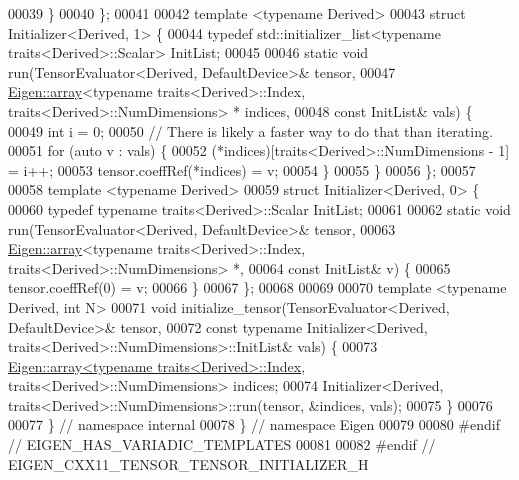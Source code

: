 \begin{DoxyCode}
00039   \}
00040 \};
00041 
00042 \textcolor{keyword}{template} <\textcolor{keyword}{typename} Derived>
00043 \textcolor{keyword}{struct }Initializer<Derived, 1> \{
00044   \textcolor{keyword}{typedef} std::initializer\_list<typename traits<Derived>::Scalar> InitList;
00045 
00046   \textcolor{keyword}{static} \textcolor{keywordtype}{void} run(TensorEvaluator<Derived, DefaultDevice>& tensor,
00047                   \hyperlink{class_eigen_1_1array}{Eigen::array}<\textcolor{keyword}{typename} traits<Derived>::Index, traits<Derived>::NumDimensions>
      * indices,
00048                   \textcolor{keyword}{const} InitList& vals) \{
00049     \textcolor{keywordtype}{int} i = 0;
00050     \textcolor{comment}{// There is likely a faster way to do that than iterating.}
00051     \textcolor{keywordflow}{for} (\textcolor{keyword}{auto} v : vals) \{
00052       (*indices)[traits<Derived>::NumDimensions - 1] = i++;
00053       tensor.coeffRef(*indices) = v;
00054     \}
00055   \}
00056 \};
00057 
00058 \textcolor{keyword}{template} <\textcolor{keyword}{typename} Derived>
00059 \textcolor{keyword}{struct }Initializer<Derived, 0> \{
00060   \textcolor{keyword}{typedef} \textcolor{keyword}{typename} traits<Derived>::Scalar InitList;
00061 
00062   \textcolor{keyword}{static} \textcolor{keywordtype}{void} run(TensorEvaluator<Derived, DefaultDevice>& tensor,
00063                   \hyperlink{class_eigen_1_1array}{Eigen::array}<\textcolor{keyword}{typename} traits<Derived>::Index, traits<Derived>::NumDimensions>
      *,
00064                   \textcolor{keyword}{const} InitList& v) \{
00065     tensor.coeffRef(0) = v;
00066   \}
00067 \};
00068 
00069 
00070 \textcolor{keyword}{template} <\textcolor{keyword}{typename} Derived, \textcolor{keywordtype}{int} N>
00071 \textcolor{keywordtype}{void} initialize\_tensor(TensorEvaluator<Derived, DefaultDevice>& tensor,
00072                        \textcolor{keyword}{const} \textcolor{keyword}{typename} Initializer<Derived, traits<Derived>::NumDimensions>::InitList& vals)
       \{
00073   \hyperlink{class_eigen_1_1array}{Eigen::array<typename traits<Derived>::Index}, 
      traits<Derived>::NumDimensions> indices;
00074   Initializer<Derived, traits<Derived>::NumDimensions>::run(tensor, &indices, vals);
00075 \}
00076 
00077 \}  \textcolor{comment}{// namespace internal}
00078 \}  \textcolor{comment}{// namespace Eigen}
00079 
00080 \textcolor{preprocessor}{#endif  // EIGEN\_HAS\_VARIADIC\_TEMPLATES}
00081 
00082 \textcolor{preprocessor}{#endif  // EIGEN\_CXX11\_TENSOR\_TENSOR\_INITIALIZER\_H}
\end{DoxyCode}
